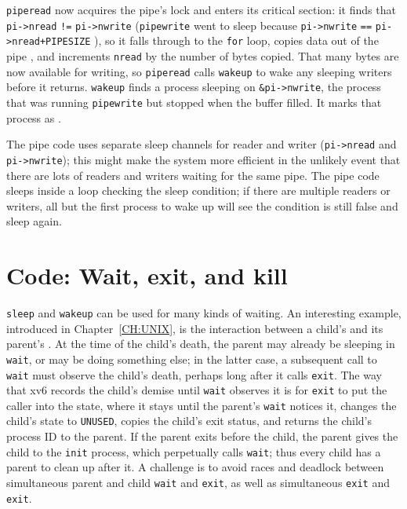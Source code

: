 \lstinline{piperead}
now acquires the pipe's lock and enters its critical section:
it finds that
\lstinline{pi->nread}
\lstinline{!=}
\lstinline{pi->nwrite}
(\lstinline{pipewrite}
went to sleep because
\lstinline{pi->nwrite}
\lstinline{==}
\lstinline{pi->nread+PIPESIZE}
),
so it falls through to the 
\lstinline{for}
loop, copies data out of the pipe
,
and increments 
\lstinline{nread}
by the number of bytes copied.
That many bytes are now available for writing, so
\lstinline{piperead}
calls
\lstinline{wakeup}
to wake any sleeping writers
before it returns.
\lstinline{wakeup}
finds a process sleeping on
\lstinline{&pi->nwrite},
the process that was running
\lstinline{pipewrite}
but stopped when the buffer filled.
It marks that process as
.

The pipe code uses separate sleep channels for reader and writer
(\lstinline{pi->nread}
and
\lstinline{pi->nwrite});
this might make the system more efficient in the unlikely
event that there are lots of
readers and writers waiting for the same pipe.
The pipe code sleeps inside a loop checking the
sleep condition; if there are multiple readers
or writers, all but the first process to wake up
will see the condition is still false and sleep again.
\section{Code: Wait, exit, and kill}
\lstinline{sleep}
and
\lstinline{wakeup}
can be used for many kinds of waiting.
An interesting example, introduced in Chapter~\ref{CH:UNIX},
is the interaction between a child's 
and its parent's .
At the time of the child's death, the parent may already
be sleeping in {\tt wait}, or may be doing something else;
in the latter case, a subsequent call to {\tt wait} must
observe the child's death, perhaps long after it calls {\tt exit}.
The way that xv6 records the child's demise until {\tt wait}
observes it is for {\tt exit} to put the caller into the 
state, where it stays until the parent's {\tt wait} notices it, changes
the child's state to {\tt UNUSED}, copies the child's exit status,
and returns the child's process ID to the parent.
If the parent exits before the child, the 
parent gives the child to the
\lstinline{init}
process, which perpetually calls {\tt wait};
thus
every child has a parent to clean up after it.
A challenge is
to avoid races and deadlock between
simultaneous parent and child
\lstinline{wait}
and
\lstinline{exit},
as well as simultaneous
\lstinline{exit} and \lstinline{exit}.

